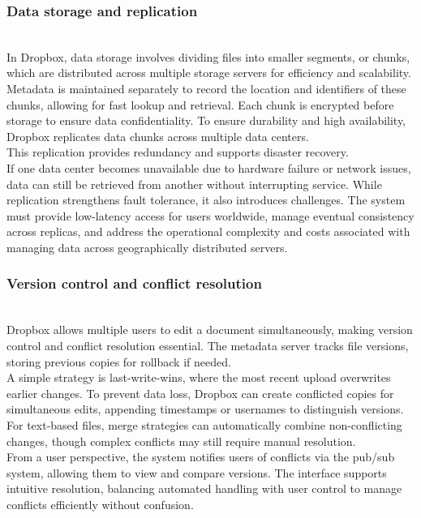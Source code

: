 \subsubsection{Data storage and replication}\label{A0Kf1CjcJeTZz0myh7hQA}
\\
In Dropbox, data storage involves dividing files into smaller segments, or chunks, which are distributed across multiple storage servers for efficiency and scalability.
\\
Metadata is maintained separately to record the location and identifiers of these chunks, allowing for fast lookup and retrieval. Each chunk is encrypted before storage to ensure data confidentiality. To ensure durability and high availability, Dropbox replicates data chunks across multiple data centers.
\\
This replication provides redundancy and supports disaster recovery.
\\
If one data center becomes unavailable due to hardware failure or network issues, data can still be retrieved from another without interrupting service. While replication strengthens fault tolerance, it also introduces challenges. The system must provide low-latency access for users worldwide, manage eventual consistency across replicas, and address the operational complexity and costs associated with managing data across geographically distributed servers.

\subsubsection{Version control and conflict resolution}\label{XIvvBbOww0KehtaYFG8Pi}
\\
Dropbox allows multiple users to edit a document simultaneously, making version control and conflict resolution essential. The metadata server tracks file versions, storing previous copies for rollback if needed.
\\
A simple strategy is last-write-wins, where the most recent upload overwrites earlier changes. To prevent data loss, Dropbox can create conflicted copies for simultaneous edits, appending timestamps or usernames to distinguish versions. For text-based files, merge strategies can automatically combine non-conflicting changes, though complex conflicts may still require manual resolution.
\\
From a user perspective, the system notifies users of conflicts via the pub/sub system, allowing them to view and compare versions. The interface supports intuitive resolution, balancing automated handling with user control to manage conflicts efficiently without confusion.

